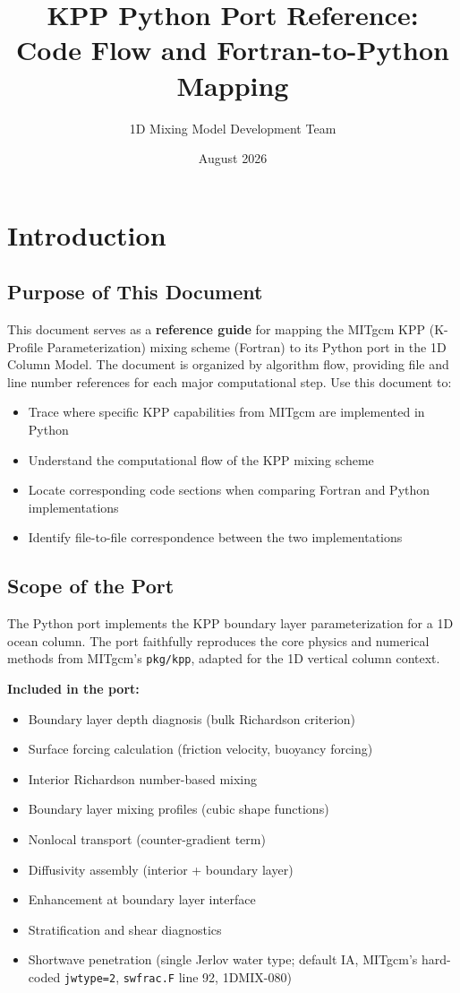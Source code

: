 \documentclass[11pt]{article}
\title{KPP Python Port Reference:\\
       Code Flow and Fortran-to-Python Mapping}
\author{1D Mixing Model Development Team}
\date{August 2026}
\begin{document}
\maketitle
\tableofcontents
\newpage

\section{Introduction}
\label{sec:introduction}

\subsection{Purpose of This Document}

This document serves as a \textbf{reference guide} for mapping the MITgcm KPP (K-Profile Parameterization) mixing scheme (Fortran) to its Python port in the 1D Column Model. The document is organized by algorithm flow, providing file and line number references for each major computational step. Use this document to:

\begin{itemize}
    \item Trace where specific KPP capabilities from MITgcm are implemented in Python
    \item Understand the computational flow of the KPP mixing scheme
    \item Locate corresponding code sections when comparing Fortran and Python implementations
    \item Identify file-to-file correspondence between the two implementations
\end{itemize}

\subsection{Scope of the Port}

The Python port implements the KPP boundary layer parameterization for a 1D ocean column. The port faithfully reproduces the core physics and numerical methods from MITgcm's \verb|pkg/kpp|, adapted for the 1D vertical column context.

\textbf{Included in the port:}
\begin{itemize}
    \item Boundary layer depth diagnosis (bulk Richardson criterion)
    \item Surface forcing calculation (friction velocity, buoyancy forcing)
    \item Interior Richardson number-based mixing
    \item Boundary layer mixing profiles (cubic shape functions)
    \item Nonlocal transport (counter-gradient term)
    \item Diffusivity assembly (interior + boundary layer)
    \item Enhancement at boundary layer interface
    \item Stratification and shear diagnostics
    \item Shortwave penetration (single Jerlov water type; default IA, MITgcm's hard-coded \verb|jwtype=2|, \verb|swfrac.F| line 92, 1DMIX-080)
\end{itemize}
\end{document}
